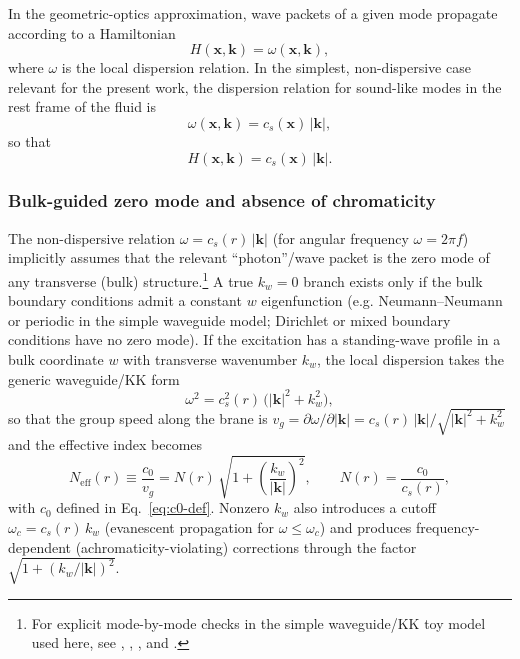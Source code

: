 \documentclass[11pt]{article}
\begin{document}
In the geometric-optics approximation, wave packets of a given mode
propagate according to a Hamiltonian
\begin{equation}
  H(\mathbf{x},\mathbf{k})
  = \omega(\mathbf{x},\mathbf{k}),
\end{equation}
where $\omega$ is the local dispersion relation.
In the simplest, non-dispersive case relevant for the present work, the
dispersion relation for sound-like modes in the rest frame of the fluid is
\begin{equation}
  \omega(\mathbf{x},\mathbf{k})
  = c_s(\mathbf{x})\,|\mathbf{k}|,
\end{equation}
so that
\begin{equation}
  H(\mathbf{x},\mathbf{k})
  = c_s(\mathbf{x})\,|\mathbf{k}|.
\end{equation}

\subsubsection{Bulk-guided zero mode and absence of chromaticity}
\label{subsubsec:w-zero-mode}

The non-dispersive relation $\omega=c_s(r)\,|\mathbf{k}|$ (for angular
frequency $\omega = 2\pi f$)
implicitly assumes that the relevant ``photon''/wave packet is the zero mode
of any transverse (bulk) structure.\footnote{For explicit mode-by-mode checks
in the simple waveguide/KK toy model used here, see
,
,
, and
.}
A true $k_w=0$ branch exists only if the bulk boundary conditions admit a
constant $w$ eigenfunction (e.g. Neumann--Neumann or periodic in the simple
waveguide model; Dirichlet or mixed boundary conditions have no zero mode).
If the excitation has a standing-wave profile in a bulk coordinate $w$ with
transverse wavenumber $k_w$, the local dispersion takes the generic
waveguide/KK form
\begin{equation}
  \omega^2 = c_s^2(r)\,\bigl(|\mathbf{k}|^2+k_w^2\bigr),
\end{equation}
so that the group speed along the brane is
$v_g = \partial\omega/\partial|\mathbf{k}|
      = c_s(r)\,|\mathbf{k}|/\sqrt{|\mathbf{k}|^2+k_w^2}$ and the effective
index becomes
\begin{equation}
  N_{\mathrm{eff}}(r) \equiv \frac{c_0}{v_g}
  = N(r)\,\sqrt{1+\left(\frac{k_w}{|\mathbf{k}|}\right)^2},
  \qquad N(r)=\frac{c_0}{c_s(r)},
\end{equation}
with $c_0$ defined in Eq.~\eqref{eq:c0-def}.
Nonzero $k_w$ also introduces a cutoff $\omega_c=c_s(r)\,k_w$ (evanescent
propagation for $\omega\le\omega_c$) and produces frequency-dependent
(achromaticity-violating) corrections through the factor
$\sqrt{1+(k_w/|\mathbf{k}|)^2}$.
\end{document}
